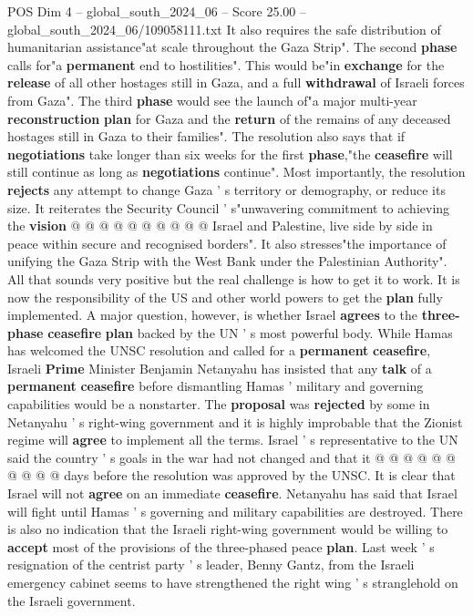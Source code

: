 \begin{textsample}{POS Dim 4 – global\_south\_2024\_06 – Score 25.00 – global\_south\_2024\_06/109058111.txt}
It also requires the safe distribution of humanitarian assistance"at scale throughout the Gaza Strip".
The second \textbf{phase} calls for"a \textbf{permanent} end to hostilities".
This would be"in \textbf{exchange} for the \textbf{release} of all other hostages still in Gaza, and a full \textbf{withdrawal} of Israeli forces from Gaza".
The third \textbf{phase} would see the launch of"a major multi-year \textbf{reconstruction} \textbf{plan} for Gaza and the \textbf{return} of the remains of any deceased hostages still in Gaza to their families".
The resolution also says that if \textbf{negotiations} take longer than six weeks for the first \textbf{phase},"the \textbf{ceasefire} will still continue as long as \textbf{negotiations} continue".
Most importantly, the resolution \textbf{rejects} any attempt to change Gaza ' s territory or demography, or reduce its size.
It reiterates the Security Council ' s"unwavering commitment to achieving the \textbf{vision} @ @ @ @ @ @ @ @ @ @ Israel and Palestine, live side by side in peace within secure and recognised borders".
It also stresses"the importance of unifying the Gaza Strip with the West Bank under the Palestinian Authority".
All that sounds very positive but the real challenge is how to get it to work.
It is now the responsibility of the US and other world powers to get the \textbf{plan} fully implemented.
A major question, however, is whether Israel \textbf{agrees} to the \textbf{three-phase} \textbf{ceasefire} \textbf{plan} backed by the UN ' s most powerful body.
While Hamas has welcomed the UNSC resolution and called for a \textbf{permanent} \textbf{ceasefire}, Israeli \textbf{Prime} Minister Benjamin Netanyahu has insisted that any \textbf{talk} of a \textbf{permanent} \textbf{ceasefire} before dismantling Hamas ' military and governing capabilities would be a nonstarter.
The \textbf{proposal} was \textbf{rejected} by some in Netanyahu ' s right-wing government and it is highly improbable that the Zionist regime will \textbf{agree} to implement all the terms.
Israel ' s representative to the UN said the country ' s goals in the war had not changed and that it @ @ @ @ @ @ @ @ @ @ days before the resolution was approved by the UNSC.
It is clear that Israel will not \textbf{agree} on an immediate \textbf{ceasefire}.
Netanyahu has said that Israel will fight until Hamas ' s governing and military capabilities are destroyed.
There is also no indication that the Israeli right-wing government would be willing to \textbf{accept} most of the provisions of the three-phased peace \textbf{plan}.
Last week ' s resignation of the centrist party ' s leader, Benny Gantz, from the Israeli emergency cabinet seems to have strengthened the right wing ' s stranglehold on the Israeli government.

\end{textsample}

